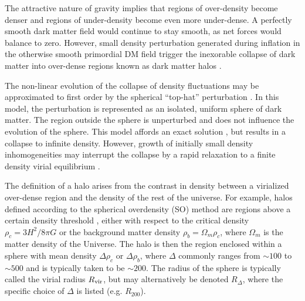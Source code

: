 The attractive nature of gravity implies that regions of over-density become denser and regions of under-density become even more under-dense.  A perfectly smooth dark matter field would continue to stay smooth, as net forces would balance to zero.  However, small density perturbation generated during inflation in the otherwise smooth primordial DM field trigger the inexorable collapse of dark matter into over-dense regions known as dark matter halos \citep{1974ApJ...187..425P, 1986ApJ...304...15B}.

The non-linear evolution of the collapse of density fluctuations may be approximated to first order by the spherical ``top-hat'' perturbation \citep{1968ApJ...151..459S, 1970ApJ...162..815P, 1970AJ.....75...13P, 1972ApJ...176....1G}.  In this model, the perturbation is represented as an isolated, uniform sphere of dark matter.  The region outside the sphere is unperturbed and does not influence the evolution of the sphere.  This model affords an exact solution \citep[][and referencees therein]{1980lssu.book.....P, 1993ppc..book.....P, 1993sfu..book.....P}, but results in a collapse to infinite density.  However, growth of initially small density inhomogeneities may interrupt the collapse by a rapid relaxation to a finite density virial equilibrium \citep[][and references therein]{1999MNRAS.307..203S, 1998FCPh...19..157M}.

The definition of a halo arises from the contrast in density between a virialized over-dense region and the density of the rest of the universe.  For example, halos defined according to the spherical overdensity (SO) method are regions above a certain density threshold \citep{1998ApJ...495...80B}, either with respect to the critical density $\rho_{c} = 3 H^{2} / 8 \pi G$ or the background matter density $\rho_{b} = \Omega_{m} \rho_{c}$, where $\Omega_{m}$ is the matter density of the Universe.  The halo is then the region enclosed within a sphere with mean density $\Delta \rho_{c}$ or $\Delta \rho_{b}$, where $\Delta$ commonly ranges from $\sim 100$ to $\sim 500$ and is typically taken to be $\sim 200$.  The radius of the sphere is typically called the virial radius ${R_{\mathrm{vir}}}$, but may alternatively be denoted $R_{\Delta}$, where the specific choice of $\Delta$ is listed (e.g. $R_{200}$).

